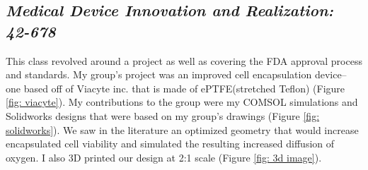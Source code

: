 \documentclass[a4paper,12pt]{article}
\begin{document}

\subsection{\textit{Medical Device Innovation and Realization: 42-678}}
This class revolved around a project as well as covering the FDA approval process and standards. My group's project was an improved cell encapsulation device-- one based off of Viacyte inc. that is made of ePTFE(stretched Teflon) (Figure \ref{fig: viacyte}). My contributions to the group were my COMSOL simulations and Solidworks designs that were based on my group's drawings (Figure \ref{fig: solidworks}). We saw in the literature \cite{Yang} an optimized geometry that would increase encapsulated cell viability and simulated the resulting increased diffusion of oxygen. I also 3D printed our design at 2:1 scale (Figure \ref{fig: 3d image}).
\end{document}
